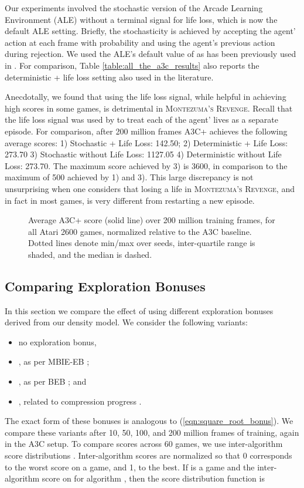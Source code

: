 \documentclass{article}
\newcommand{\eqnref}[1]{(\ref{eqn:#1})}
\newcommand{\gamename}[1]{\textsc{#1}}
\begin{document}
{Our experiments involved the stochastic version of the Arcade Learning Environment (ALE) without a terminal signal for life loss, which is now the default ALE setting. Briefly, the stochasticity is achieved by accepting the agent’ action at each frame with probability  and using the agent’s previous action during rejection. We used the ALE's default value of  as has been previously used in \cite{bellemare16increasing}. For comparison, Table \ref{table:all_the_a3c_results} also reports the deterministic + life loss setting also used in the literature.

Anecdotally, we found that using the life loss signal, while helpful in achieving high scores in
some games, is detrimental in \gamename{Montezuma's Revenge}. Recall that the life loss signal
was used by \citet{mnih15human} to treat each of the agent' lives as a separate episode. 
For comparison, after 200 million
frames A3C+ achieves the following average scores: 1) Stochastic + Life Loss: 142.50; 2) Deterministic + Life Loss: 273.70 3) Stochastic without Life Loss: 1127.05 4) Deterministic without Life Loss: 273.70. The maximum score achieved by 3) is 3600, in comparison to the maximum of 500 achieved by 1) and 3). This large discrepancy is not unsurprising when one considers that losing a life in
\gamename{Montezuma's Revenge}, and in fact in most games, is very different from restarting a
new episode.

\begin{figure*}
\caption{Average A3C+ score (solid line) over 200 million training frames, for all Atari 2600 games, normalized relative to the A3C baseline. 
Dotted lines denote min/max over seeds, inter-quartile range is shaded, and the median is dashed.
\label{fig:a3c_all}} 
\end{figure*}

\subsection{Comparing Exploration Bonuses}

In this section we compare the effect of using different exploration bonuses derived from our density model. We consider the following variants:
\begin{itemize}
    \item{no exploration bonus,}
    \item{, as per MBIE-EB \citep{strehl08analysis};}
    \item{, as per BEB \citep{kolter09near}; and}
    \item{, related to compression progress \citep{schmidhuber08driven}.}
\end{itemize}
The exact form of these bonuses is analogous to \eqnref{square_root_bonus}.
We compare these variants after 10, 50, 100, and 200 million frames of training, again in the A3C setup. To compare scores across 60 games, we use inter-algorithm score distributions \citep{bellemare13arcade}. Inter-algorithm scores are normalized so that 0 corresponds to the worst score on a game, and 1, to the best. 
If  is a game and  the inter-algorithm score on  for algorithm , then the score distribution function is 

}
\end{document}

